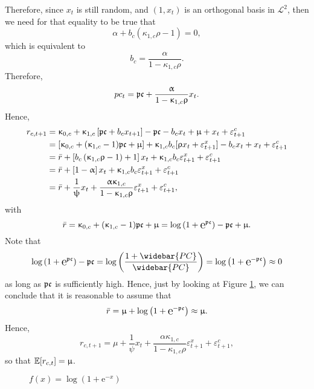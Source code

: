 Therefore, since $x_t$ is still random, and $( 1, x_t)$ is an orthogonal basis in $\mathcal{L}^2$, then we need for that equality to be true that
$$
\alpha+b_c(\kappa_{1,c}\rho-1) = 0,
$$
which is equivalent to
\begin{equation}\label{eq:bc}
	b_c = \frac{\alpha}{1-\kappa_{1,c}\rho}.
\end{equation}
Therefore,
\begin{equation}
	pc_{t} = \mathfrak{pc} +  \frac{\upalpha}{1-\upkappa_{1,c}\uprho}x_t.
\end{equation}
Hence,
\begin{equation}
	\begin{aligned}
		r_{c,t+1} &= \upkappa_{0,c} + \upkappa_{1,c}\left[\mathfrak{pc} + b_c x_{t+1}\right] - \mathfrak{pc} - b_c x_t + \upmu + x_t + \varepsilon_{t+1}^c\\
		&= \left[\upkappa_{0,c} + (\upkappa_{1,c}-1)\mathfrak{pc} + \upmu\right] + \upkappa_{1,c} b_c [\uprho x_{t} + \varepsilon_{t+1}^x] - b_c x_t + x_t + \varepsilon_{t+1}^c\\
		&= \bar{r} + \left[b_c\left(\upkappa_{1,c}\uprho-1\right) + 1\right]x_t + \upkappa_{1,c} b_c \varepsilon_{t+1}^x + \varepsilon_{t+1}^c\\
		&= \bar{r} + \left[1-\upalpha\right]x_t + \upkappa_{1,c} b_c \varepsilon_{t+1}^x + \varepsilon_{t+1}^c\\
		&= \bar{r} + \frac{1}{\uppsi}x_t +  \frac{\upalpha\upkappa_{1,c}}{1-\upkappa_{1,c}\uprho} \varepsilon_{t+1}^x + \varepsilon_{t+1}^c,\\
	\end{aligned}
\end{equation}
with
\begin{equation}
	\bar{r} = \kappa_{0,c} + (\kappa_{1,c}-1)\pcbar + \mu = \log\left(1+\e{\pcbar}\right) - \pcbar + \mu.
\end{equation}
Note that
$$
\log\left(1+\e{\pcbar}\right) - \pcbar = \log\left(\frac{1+\widebar{PC}}{\widebar{PC}}\right) = \log\left(1+\e{-\pcbar}\right)\approx 0
$$
as long as $\mathfrak{pc}$ is sufficiently high. Hence, just by looking at Figure \ref{fig:fig1}, we can conclude that it is reasonable to assume that
$$
	\bar{r} = \mu + \log\left(1+\e{-\pcbar}\right)\approx \mu.
$$
Hence,
\begin{equation}
	r_{c,t+1} = \mu + \frac{1}{\psi}x_t +  \frac{\alpha\kappa_{1,c}}{1-\kappa_{1,c}\rho} \varepsilon_{t+1}^x + \varepsilon_{t+1}^c,
\end{equation}
so that $\mathbb{E}[r_{c,t}] = \upmu$.
\begin{figure}
	\centering
\caption{$f(x) = \log\left(1+\text{e}^{-x}\right)$ }\label{fig:fig1}
\end{figure}
